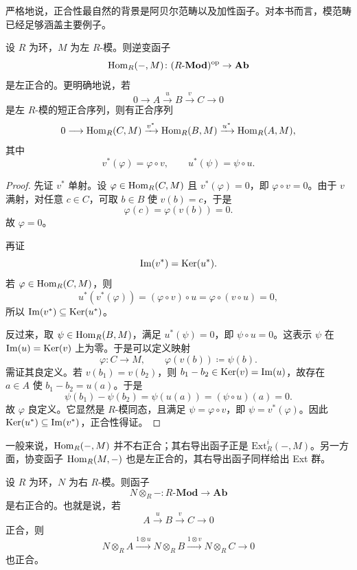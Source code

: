 \begin{remark}
严格地说，正合性最自然的背景是阿贝尔范畴以及加性函子。对本书而言，模范畴已经足够涵盖主要例子。
\end{remark}

\begin{proposition}
设 $R$ 为环，$M$ 为左 $R$-模。则逆变函子
\[
  \mathrm{Hom}_R(-,M)\colon (R\text{-}\mathbf{Mod})^{\mathrm{op}}\to \mathbf{Ab}
\]
是左正合的。更明确地说，若
\[
  0\longrightarrow A\xrightarrow{u} B\xrightarrow{v} C\longrightarrow 0
\]
是左 $R$-模的短正合序列，则有正合序列
\[
  0\longrightarrow \mathrm{Hom}_R(C,M)
  \xrightarrow{v^{\ast}} \mathrm{Hom}_R(B,M)
  \xrightarrow{u^{\ast}} \mathrm{Hom}_R(A,M),
\]
其中
\[
  v^{\ast}(\varphi)=\varphi\circ v,
  \qquad
  u^{\ast}(\psi)=\psi\circ u.
\]
\end{proposition}

\begin{proof}
先证 $v^{\ast}$ 单射。设 $\varphi\in \mathrm{Hom}_R(C,M)$ 且 $v^{\ast}(\varphi)=0$，即 $\varphi\circ v=0$。由于 $v$ 满射，对任意 $c\in C$，可取 $b\in B$ 使 $v(b)=c$，于是
\[
  \varphi(c)=\varphi(v(b))=0.
\]
故 $\varphi=0$。

再证
\[
  \mathrm{Im}(v^{\ast})=\mathrm{Ker}(u^{\ast}).
\]
若 $\varphi\in \mathrm{Hom}_R(C,M)$，则
\[
  u^{\ast}(v^{\ast}(\varphi))=(\varphi\circ v)\circ u=
  \varphi\circ (v\circ u)=0,
\]
所以 $\mathrm{Im}(v^{\ast})\subseteq \mathrm{Ker}(u^{\ast})$。

反过来，取 $\psi\in \mathrm{Hom}_R(B,M)$，满足 $u^{\ast}(\psi)=0$，即 $\psi\circ u=0$。这表示 $\psi$ 在 $\mathrm{Im}(u)=\mathrm{Ker}(v)$ 上为零。于是可以定义映射
\[
  \varphi\colon C\to M,
  \qquad
  \varphi(v(b))\coloneqq \psi(b).
\]
需证其良定义。若 $v(b_1)=v(b_2)$，则 $b_1-b_2\in \mathrm{Ker}(v)=\mathrm{Im}(u)$，故存在 $a\in A$ 使 $b_1-b_2=u(a)$。于是
\[
  \psi(b_1)-\psi(b_2)=\psi(u(a))=(\psi\circ u)(a)=0.
\]
故 $\varphi$ 良定义。它显然是 $R$-模同态，且满足 $\psi=\varphi\circ v$，即 $\psi=v^{\ast}(\varphi)$。因此 $\mathrm{Ker}(u^{\ast})\subseteq \mathrm{Im}(v^{\ast})$，正合性得证。
\end{proof}

\begin{remark}
一般来说，$\mathrm{Hom}_R(-,M)$ 并不右正合；其右导出函子正是 $\mathrm{Ext}_R^i(-,M)$。另一方面，协变函子 $\mathrm{Hom}_R(M,-)$ 也是左正合的，其右导出函子同样给出 Ext 群。
\end{remark}

\begin{proposition}[张量积的右正合性]
设 $R$ 为环，$N$ 为右 $R$-模。则函子
\[
  N\otimes_R -\colon R\text{-}\mathbf{Mod}\to \mathbf{Ab}
\]
是右正合的。也就是说，若
\[
  A\xrightarrow{u} B\xrightarrow{v} C\longrightarrow 0
\]
正合，则
\[
  N\otimes_R A\xrightarrow{1\otimes u} N\otimes_R B\xrightarrow{1\otimes v} N\otimes_R C\longrightarrow 0
\]
也正合。
\end{proposition}

